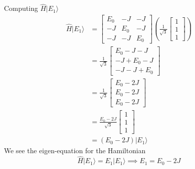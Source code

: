 \documentclass[letter]{article}
\begin{document}
Computing $\hat{H} | E_1 \rangle $
\begin{align*}
	\hat{H} | E_1 \rangle  &=  
	\begin{bmatrix} E_0&-J&-J\\-J&E_0&-J\\-J&-J&E_0 \end{bmatrix} 
	\left(
\frac{1}{\sqrt{3} } \begin{bmatrix} 1\\1\\1 \end{bmatrix} 
	\right)
	\\
	&= 
\frac{1}{\sqrt{3} } 
\begin{bmatrix} E_0 - J - J \\ -J + E_0 - J \\ - J - J + E_0  \end{bmatrix} 
	\\
	&= 
\frac{1}{\sqrt{3} } 
\begin{bmatrix} E_0 - 2J \\ E_0 - 2 J \\ E_0 - 2J  \end{bmatrix} 
	\\ 
	&= \frac{E_0 - 2J}{\sqrt{3} } \begin{bmatrix} 1\\1\\1 \end{bmatrix}  \\
	&= \left(E_0 - 2J\right) | E_1 \rangle  
\end{align*}
We see the eigen-equation for the Hamiltonian 
\[
\hat{H} | E_1 \rangle  = E_1 | E_1 \rangle  \implies E_1 = E_0 - 2J
\] 
\end{document}
